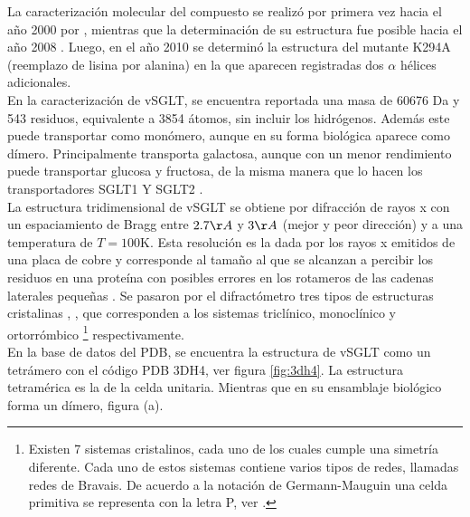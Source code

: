 La caracterizaci\'{o}n molecular del compuesto se realiz\'{o} por primera vez hacia el a\~{n}o 2000 por \cite{Turk2000}, mientras que la determinaci\'{o}n de su estructura fue posible hacia el a\~{n}o 2008 \cite{Faham2008}. Luego, en el a\~{n}o 2010 se determin\'{o} la estructura del mutante K294A (reemplazo de lisina por alanina) en la que aparecen registradas dos $\alpha$ h\'{e}lices adicionales.\\

En la caracterizaci\'{o}n de vSGLT, se encuentra reportada una  masa de 60676 Da y 543 residuos, equivalente a 3854 \'{a}tomos, sin incluir los hidr\'{o}genos. Adem\'{a}s este puede transportar como mon\'{o}mero,  aunque en su forma biol\'{o}gica aparece como d\'{i}mero. Principalmente transporta galactosa, aunque con un menor rendimiento puede transportar glucosa y fructosa, de la misma manera que lo hacen los transportadores SGLT1 Y SGLT2 \cite{SaierJr.}.\\

La estructura tridimensional de vSGLT \cite{Faham2008} se obtiene por difracci\'{o}n de rayos x con un espaciamiento de Bragg entre $2.7\AA$ y $3\AA$ (mejor y peor direcci\'{o}n) y  a una temperatura de $T=100$K. Esta  resoluci\'{o}n es la dada por los rayos x emitidos de una placa de cobre y corresponde al tama\~{n}o al que se alcanzan a percibir los residuos en una prote\'{i}na con posibles errores en los rotameros de las cadenas laterales peque\~{n}as \cite{Huang2007}. Se pasaron por el difract\'{o}metro tres tipos de estructuras cristalinas , ,   que corresponden a los sistemas tricl\'{i}nico, monocl\'{i}nico y ortorr\'{o}mbico \footnote{Existen 7 sistemas cristalinos, cada uno de los cuales cumple una simetr\'{i}a diferente. Cada uno de estos sistemas contiene varios tipos de redes, llamadas redes de Bravais. De acuerdo a la notaci\'{o}n de Germann-Mauguin una celda primitiva se representa con la letra P, ver \cite{VainshteinModernCrystallography}.} respectivamente.\\

En la base de datos del PDB, se encuentra la estructura de vSGLT  como un tetr\'{a}mero con el c\'{o}digo PDB 3DH4, ver figura \ref{fig:3dh4}. La estructura tetram\'{e}rica es la de la celda unitaria. Mientras que en su ensamblaje biol\'{o}gico forma un d\'{i}mero, figura \label{fig:complejo} (a).

